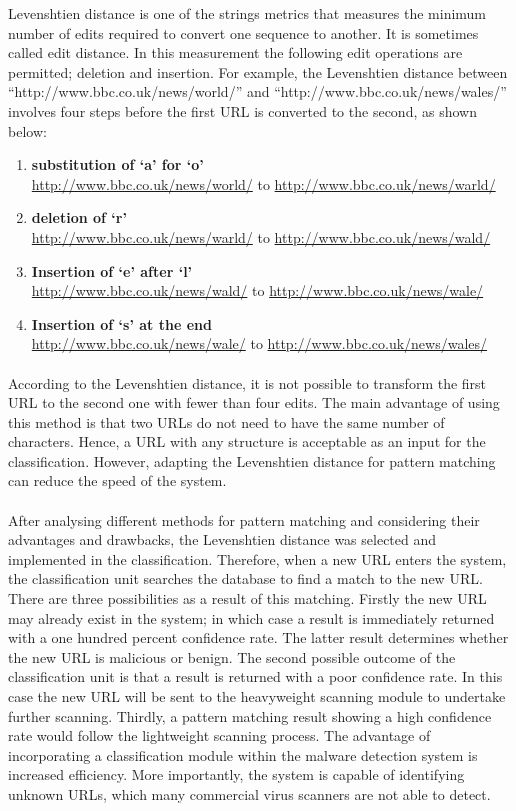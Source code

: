 Levenshtien distance is one of the strings metrics that measures the minimum number of edits required to convert one sequence to another. It is sometimes called edit distance. In this measurement the following edit operations are permitted; deletion and insertion. 
For example, the Levenshtien distance between ``http://www.bbc.co.uk/news/world/'' and ``http://www.bbc.co.uk/news/wales/'' involves four steps before the first URL is converted to the second, as shown below:
\begin{enumerate}
\item 
{\bf substitution of `a' for `o'}\\
\url{http://www.bbc.co.uk/news/world/} to \url{http://www.bbc.co.uk/news/warld/}
\item
{\bf deletion of `r' }\\
\url{http://www.bbc.co.uk/news/warld/} to \url{http://www.bbc.co.uk/news/wald/}
\item
{\bf Insertion of `e' after `l'}\\
\url{http://www.bbc.co.uk/news/wald/} to \url{http://www.bbc.co.uk/news/wale/}
\item
{\bf Insertion of `s' at the end}\\
\url{http://www.bbc.co.uk/news/wale/} to \url{http://www.bbc.co.uk/news/wales/}
\end{enumerate}

\paragraph{} 
According to the Levenshtien distance, it is not possible to transform the first URL to the second one with fewer than four edits. The main advantage of using this method is that two URLs do not need to have the same number of characters. Hence, a URL with any structure is acceptable as an input for the classification. However, adapting the Levenshtien distance for pattern matching can reduce the speed of the system.

\paragraph{} 
After analysing different methods for pattern matching and considering their advantages and drawbacks, the Levenshtien distance was selected and implemented in the classification.  Therefore, when a new URL enters the system, the classification unit searches the database to find a match to the new URL. There are three possibilities as a result of this matching. Firstly the new URL may already exist in the system; in which case a result is immediately returned with a one hundred percent confidence rate. The latter result determines whether the new URL is malicious or benign. The second possible outcome of the classification unit is that a result is returned with a poor confidence rate. In this case the new URL will be sent to the heavyweight scanning module to undertake further scanning. Thirdly, a pattern matching result showing a high confidence rate would follow the lightweight scanning process.
The advantage of incorporating a classification module within the malware detection system is increased efficiency. More importantly, the system is capable of identifying unknown URLs, which many commercial virus scanners are not able to detect. 
